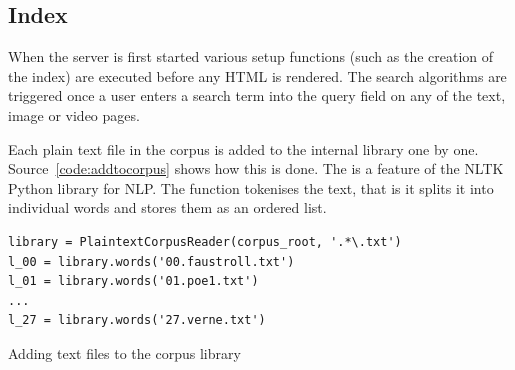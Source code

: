 

\subsection{Index}
\label{s:index}

When the server is first started various setup functions (such as the creation of the index) are executed before any HTML is rendered. The search algorithms are triggered once a user enters a search term into the query field on any of the text, image or video pages.

Each plain text file in the corpus is added to the internal library one by one. Source~\ref{code:addtocorpus} shows how this is done. The  is a feature of the \ac{NLTK} Python library \autocite{NLTK2016} for \acl{NLP}. The  function tokenises the text, that is it splits it into individual words and stores them as an ordered list.

\begin{listing}
  \begin{verbatim}
library = PlaintextCorpusReader(corpus_root, '.*\.txt')
l_00 = library.words('00.faustroll.txt')
l_01 = library.words('01.poe1.txt')
...
l_27 = library.words('27.verne.txt')
  \end{verbatim}
\caption{Adding text files to the corpus library}
\label{code:addtocorpus}
\end{listing}

